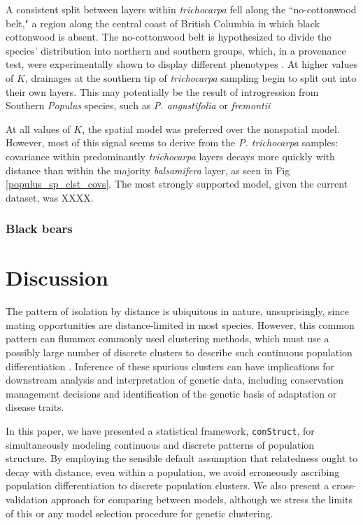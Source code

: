 \documentclass[12pt]{article}
\newcommand{\tri}{\textit{trichocarpa}}
\newcommand{\bals}{\textit{balsamifera}}
\newcommand{\plr}[1]{{\it\color{purple}{(#1)}}}
\begin{document}
A consistent split between layers within \tri{} fell along the ``no-cottonwood belt," 
a region along the central coast of British Columbia in which black cottonwood is absent. 
The no-cottonwood belt is hypothesized to divide the species' distribution 
into northern and southern groups, which, in a provenance test, 
were experimentally shown to display different phenotypes 
\citep[pathogen resistance][]{xie2009,xie2012}.  
At higher values of $K$, drainages at the southern tip of \tri{} sampling 
begin to split out into their own layers.  
\plr{cut this if we pick lower $K$? Or add a disclaimer?}
This may potentially be the result of introgression from Southern \textit{Populus} species, 
such as \textit{P. angustifolia} or \textit{fremontii} \citep{Zhou2012,geraldes_etal_2014}

At all values of $K$, the spatial model was preferred over the nonspatial model.
However, most of this signal seems to derive from the \textit{P. trichocarpa} samples:
covariance within predominantly \tri{} layers decays more quickly with distance
than within the majority \bals{} layer, as seen in Fig \ref{populus_sp_clst_covs}.
The most strongly supported model, given the current dataset, was XXXX.


\subsubsection*{Black bears}


\section*{Discussion}

The pattern of isolation by distance is ubiquitous in nature,
unsuprisingly, since mating opportunities are distance-limited in most species.
However,
this common pattern can flummox commonly used clustering methods, 
which must use a possibly large number of discrete clusters
to describe such continuous population differentiation .
Inference of these spurious clusters can have implications for 
downstream analysis and interpretation of genetic data, 
including conservation management decisions and 
identification of the genetic basis of adaptation or disease traits.

In this paper, we have presented a statistical framework, \texttt{conStruct}, for simultaneously 
modeling continuous and discrete patterns of population structure.
By employing the sensible default assumption
that relatedness ought to decay with distance, even within a population, 
we avoid erroneously ascribing population differentiation to discrete population clusters.
We also present a cross-validation approach for comparing between models, 
although we stress the limits of this or any model selection procedure for genetic clustering.
\end{document}
